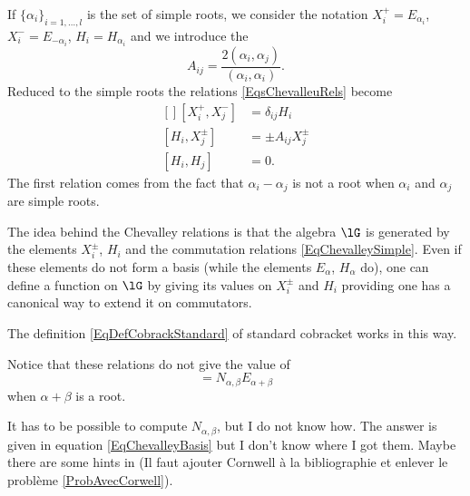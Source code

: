 If \( \{ \alpha_i \}_{i=1,\ldots,l}\) is the set of simple roots, we consider the notation \( X_i^+=E_{\alpha_i}\), \( X^-_i=E_{-\alpha_i}\), \( H_i=H_{\alpha_i}\) and we introduce the 
\begin{equation}
    A_{ij}=\frac{ 2(\alpha_i,\alpha_j) }{ (\alpha_i,\alpha_i) }.
\end{equation}
Reduced to the simple roots the relations \eqref{EqsChevalleuRels} become
\begin{equation}        \label{EqChevalleySimple}
    \begin{aligned}[]
        [X^+_i,X^-_j]&=\delta_{ij}H_i\\
        [H_i,X^{\pm}_j]&=\pm A_{ij}X^{\pm}_j\\
        [H_i,H_j]&=0.
    \end{aligned}
\end{equation}
The first relation comes from the fact that \( \alpha_i-\alpha_j\) is not a root when \( \alpha_i\) and \( \alpha_j\) are simple roots. 

\begin{remark}
    The idea behind the Chevalley relations  is that the algebra \( \lG\) is generated by the elements \( X^{\pm}_i\), \( H_i\) and the commutation relations \eqref{EqChevalleySimple}. Even if these elements do not form a basis (while the elements \( E_{\alpha}\), \( H_{\alpha}\) do), one can define a function on \( \lG\) by giving its values on \( X^{\pm}_i\) and \( H_i\) providing one has a canonical way to extend it on commutators.

    The definition \ref{EqDefCobrackStandard} of standard cobracket works in this way.
\end{remark}

\begin{remark}
    Notice that these relations do not give the value of
    \begin{equation}
        [E_{\alpha},E_{\beta}]=N_{\alpha,\beta}E_{\alpha+\beta}
    \end{equation}
    when \( \alpha+\beta\) is a root.
\end{remark}

\begin{probleme}
    It has to be possible to compute \( N_{\alpha,\beta}\), but I do not know how. The answer is given in equation \eqref{EqChevalleyBasis} but I don't know where I got them. Maybe there are some hints in \cite{Cornwell} (Il faut ajouter Cornwell à la bibliographie et enlever le problème \ref{ProbAvecCorwell}).
\end{probleme}

